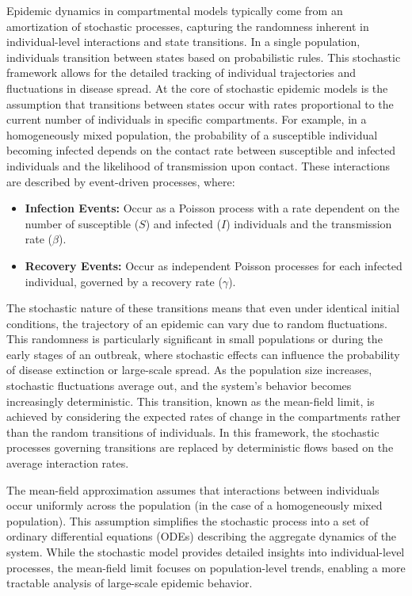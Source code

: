 Epidemic dynamics in compartmental models typically come from an amortization of stochastic processes, capturing the randomness inherent in individual-level interactions and state transitions. In a single population, individuals transition between states based on probabilistic rules. This stochastic framework allows for the detailed tracking of individual trajectories and fluctuations in disease spread. At the core of stochastic epidemic models is the assumption that transitions between states occur with rates proportional to the current number of individuals in specific compartments. For example, in a homogeneously mixed population, the probability of a susceptible individual becoming infected depends on the contact rate between susceptible and infected individuals and the likelihood of transmission upon contact. These interactions are described by event-driven processes, where:

\begin{itemize}
    \item \textbf{Infection Events:} Occur as a Poisson process with a rate dependent on the number of susceptible ($S$) and infected ($I$) individuals and the transmission rate ($\beta$).
    \item \textbf{Recovery Events:} Occur as independent Poisson processes for each infected individual, governed by a recovery rate ($\gamma$).
\end{itemize}

The stochastic nature of these transitions means that even under identical initial conditions, the trajectory of an epidemic can vary due to random fluctuations. This randomness is particularly significant in small populations or during the early stages of an outbreak, where stochastic effects can influence the probability of disease extinction or large-scale spread. As the population size increases, stochastic fluctuations average out, and the system's behavior becomes increasingly deterministic. This transition, known as the mean-field limit, is achieved by considering the expected rates of change in the compartments rather than the random transitions of individuals. In this framework, the stochastic processes governing transitions are replaced by deterministic flows based on the average interaction rates.

The mean-field approximation assumes that interactions between individuals occur uniformly across the population (in the case of a homogeneously mixed population). This assumption simplifies the stochastic process into a set of ordinary differential equations (ODEs) describing the aggregate dynamics of the system. While the stochastic model provides detailed insights into individual-level processes, the mean-field limit focuses on population-level trends, enabling a more tractable analysis of large-scale epidemic behavior.

